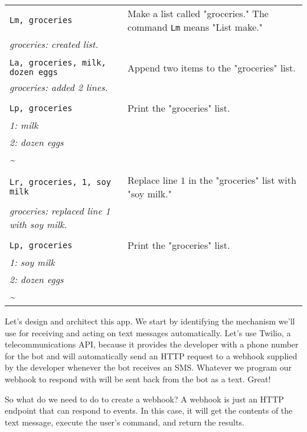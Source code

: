 \documentclass{article}
\newcommand{\user}[1]{\texttt{#1}}
\newcommand{\marcus}[1]{\textit{#1}}
\begin{document}
\begin{tabular}{ l | l }
  \user{Lm, groceries} & Make a list called "groceries." The command \user{Lm} means "List make." \\
  \marcus{groceries: created list.} & \\

  \\

  \user{La, groceries, milk, dozen eggs} & Append two items to the "groceries" list. \\
  \marcus{groceries: added 2 lines.} & \\

  \\

  \user{Lp, groceries} & Print the "groceries" list. \\
  \marcus{1: milk} & \\
  \marcus{2: dozen eggs} & \\
  \marcus{\textasciitilde} & \\

  \\

  \user{Lr, groceries, 1, soy milk} & Replace line $1$ in the "groceries" list with "soy milk." \\
  \marcus{groceries: replaced line 1 with soy milk.} & \\

  \\

  \user{Lp, groceries} & Print the "groceries" list. \\
  \marcus{1: soy milk} & \\
  \marcus{2: dozen eggs} & \\
  \marcus{\textasciitilde} & \\
\end{tabular}

Let's design and architect this app.
We start by identifying the mechanism we'll use for receiving and acting on text messages automatically.
Let's use Twilio, a telecommunications API, because it provides the developer with a phone number for the bot and will automatically send an HTTP request to a webhook supplied by the developer whenever the bot receives an SMS.
Whatever we program our webhook to respond with will be sent back from the bot as a text.
Great!

So what do we need to do to create a webhook?
A webhook is just an HTTP endpoint that can respond to events.
In this case, it will get the contents of the text message, execute the user's command, and return the results.
\end{document}
